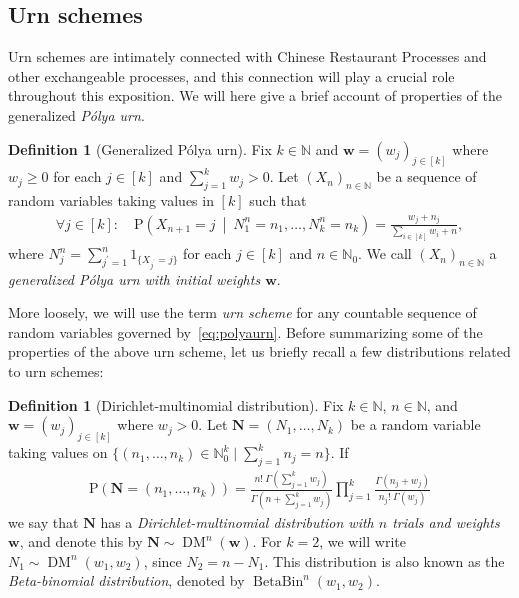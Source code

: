 \documentclass[a4paper, final]{amsart}
\theoremstyle{plain}
\theoremstyle{definition}
\newtheorem{defi}[thm]{Definition}
\DeclareMathOperator{\dirmult}{DM}
\DeclareMathOperator{\betabin}{BetaBin}
\newcommand{\nin}{{n \in \mathbb{N}}}
\renewcommand{\P}{\mathrm{P}}
\newcommand{\N}{\mathbb{N}}
\begin{document}
\subsection{Urn schemes}
%
Urn schemes are intimately connected with Chinese Restaurant Processes and other exchangeable processes, and this connection will play a crucial role throughout this exposition.
We will here give a brief account of properties of the generalized \textit{P\'{o}lya urn}.
%
\begin{defi}[Generalized P\'{o}lya urn]
  Fix $k \in \N$ and $\mathbf{w} = {\left(w_j\right)}_{j \in [k]}$ where $w_j \geq 0$ for each $j \in [k]$ and $\sum_{j=1}^k w_j > 0$. 
  Let ${(X_n)}_\nin$ be a sequence of random variables taking values in $[k]$ such that
  \begin{align}
    \forall j \in [k] \colon \quad \P \left( X_{n+1} = j \ \middle \vert \ N_1^n = n_1, \ldots, N_k^n = n_k \right) = \frac{w_j + n_j}{\sum_{i \in [k]} w_i + n},
    \label{eq:polyaurn}
  \end{align}
  where $N_j^n = \sum_{j^\prime = 1}^n 1_{\{X_{j^\prime} = j\}}$ for each $j \in [k]$ and $n \in \N_0$.
  We call ${(X_n)}_\nin$ a \textit{generalized P\'{o}lya urn with initial weights $\mathbf{w}$}.
  \label{def:polyaurn}
\end{defi}
%
More loosely, we will use the term \textit{urn scheme} for any countable sequence of random variables governed by~\eqref{eq:polyaurn}.
Before summarizing some of the properties of the above urn scheme, let us briefly recall a few distributions related to urn schemes:
%
\begin{defi}[Dirichlet-multinomial distribution]
  Fix $k \in \N$, $\nin$, and $\mathbf{w} = {(w_j)}_{j \in [k]}$ where $w_j > 0$. 
  Let $\mathbf{N} = (N_1, \ldots, N_k)$ be a random variable taking values on $\{(n_1, \ldots, n_k) \in \N_0^k \mid \sum_{j=1}^k n_j = n\}$.
  If
  \begin{align}
    \P \left( \mathbf{N} = (n_1, \ldots, n_k) \right)
    = \frac{n!\ \Gamma \left( \sum_{j=1}^k w_j \right)}{\Gamma \left( n + \sum_{j=1}^k w_j \right)} \prod_{j = 1}^k \frac{\Gamma (n_j + w_j)}{n_j!\ \Gamma ( w_j)}
    \label{eq:dirmult}
  \end{align}
  we say that $\mathbf{N}$ has a \textit{Dirichlet-multinomial distribution with $n$ trials and weights $\mathbf{w}$}, and denote this by $\mathbf{N} \sim \dirmult^n(\mathbf{w})$.
  For $k = 2$, we will write $N_1 \sim \dirmult^n(w_1,w_2)$, since $N_2 = n - N_1$.
  This distribution is also known as the \textit{Beta-binomial distribution}, denoted by $\betabin^n(w_1, w_2)$.
\end{defi}
\end{document}
